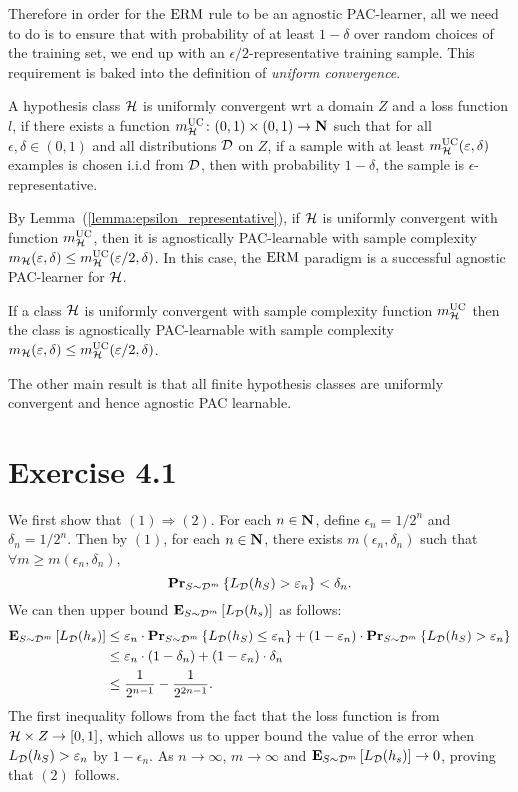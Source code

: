 Therefore in order for the $\operatorname{ERM}$ rule to be an agnostic PAC-learner, all we
need to do is to ensure that with probability of at least $1 - \delta$ over
random choices of the training set, we end up with an
$\epsilon/2$-representative training sample. This requirement is baked into
the definition of \emph{uniform convergence}.

\begin{definition}
A hypothesis class $\mathcal{H}$ is uniformly convergent wrt a domain $Z$
and a loss function $l$, if there exists a function
$m_{\mathcal{H}}^{\text{UC}} \colon (0, 1) \times (0, 1) \rightarrow \mathbf{N}$ such that
for all $\epsilon, \delta \in (0, 1)$ and all distributions $\mathcal{D}$ on $Z$,
if a sample with at least $m_{\mathcal{H}}^{\text{UC}}(\varepsilon, \delta)$ examples is chosen
i.i.d from $\mathcal{D}$, then with probability $1 - \delta$, the sample is
$\epsilon$-representative.
\end{definition}

By Lemma~(\ref{lemma:epsilon_representative}), if $\mathcal{H}$ is uniformly
convergent with function $m_{\mathcal{H}}^{\text{UC}}$, then it is agnostically PAC-learnable
with sample complexity $m_{\mathcal{H}}(\varepsilon, \delta) \leq
m_{\mathcal{H}}^{\text{UC}}(\varepsilon / 2, \delta)$. In this case, the $\operatorname{ERM}$ paradigm is a
successful agnostic PAC-learner for $\mathcal{H}$.
\begin{corollary}
If a class $\mathcal{H}$ is uniformly convergent with sample complexity function
$m_{\mathcal{H}}^{\text{UC}}$ then the class is agnostically PAC-learnable with sample complexity
$m_{\mathcal{H}}(\varepsilon, \delta) \leq m_{\mathcal{H}}^{\text{UC}}(\varepsilon / 2, \delta)$.
\end{corollary}

The other main result is that all finite hypothesis classes are uniformly convergent
and hence agnostic PAC learnable.

\section*{Exercise 4.1}

We first show that $(1) \Rightarrow (2)$. For each $n \in \mathbf{N}$, define
$\epsilon_n = 1 / 2^n$ and $\delta_n = 1 / 2^n$. Then by $(1)$, for each
$n \in \mathbf{N}$, there exists $m(\epsilon_n, \delta_n)$ such that
$\forall m \geq m(\epsilon_n, \delta_n)$,
\[
    \mathbf{Pr}_{S \sim \mathcal{D}^{m}} \left \{ L_{\mathcal{D}} (h_S) > \varepsilon_n \right \} < \delta_n.
\]
We can then upper bound $\mathbf{E}_{S \sim \mathcal{D}^m} \left [ L_{\mathcal{D}}(h_s) \right ]$ as follows:
\begin{align*}
\mathbf{E}_{S \sim \mathcal{D}^m} \left [ L_{\mathcal{D}} (h_s) \right ]
& \leq \varepsilon_n \cdot  \mathbf{Pr}_{S \sim \mathcal{D}^{m}} \left \{ L_{\mathcal{D}} (h_S) \leq \varepsilon_n \right \} +
    (1 - \varepsilon_n) \cdot  \mathbf{Pr}_{S \sim \mathcal{D}^{m}} \left \{ L_{\mathcal{D}} (h_S) > \varepsilon_n \right \} \\
& \leq \varepsilon_n \cdot (1 - \delta_n) + (1 - \varepsilon_n) \cdot \delta_n \\
& \leq \frac{1}{2^{n - 1}} - \frac{1}{2^{2n - 1}}.
\end{align*}
The first inequality follows from the fact that the loss function is from
$\mathcal{H} \times Z \rightarrow [0, 1]$, which allows us to upper bound the value of the error
when $L_{\mathcal{D}} (h_S) > \varepsilon_n$ by $1 - \epsilon_n$. As $n \to \infty$, $m \to \infty$
and $\mathbf{E}_{S \sim \mathcal{D}^m} \left [ L_{\mathcal{D}} (h_s) \right ] \to 0$, proving that $(2)$ follows.

